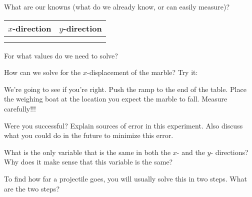 \documentclass[10pt]{exam}
\begin{document}
\begin{questions}
  \question
    What are our knowns (what do we already know, or can easily measure)?

    \begin{center}
      \begin{tabular}{c|c}
        $x$-direction & $y$-direction \\
        \hline \\
        \\[3em]
      \end{tabular}
    \end{center}
  
  \question
    For what values do we need to solve?
    \vspace{3em}
  
  \question
    How can we solve for the $x$-displacement of the marble?  Try it:

  \pagebreak
  
  \question
    We're going to see if you're right.  Push the ramp to the end of the table.  Place the weighing boat at the location you expect the marble to fall.  Measure carefully!!!
  
  \question
    Were you successful?  Explain sources of error in this experiment.  Also discuss what you could do in the future to minimize this error.
    \vs
  
  
  \question
    What is the only variable that is the same in both the $x$- and the $y$- directions?  Why does it make sense that this variable is the same?
    \vs
  
  \question
    To find how far a projectile goes, you will usually solve this in two steps.  What are the two steps?
    \vs
\end{questions}
\end{document}
